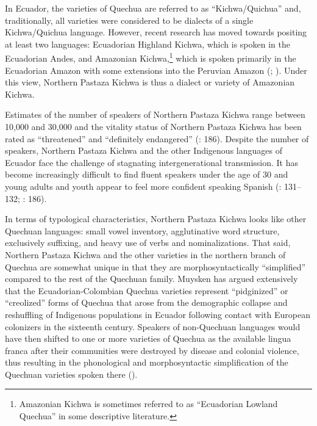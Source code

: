\documentclass[output=paper]{langscibook}
\begin{document}
In Ecuador, the varieties of Quechua are referred to as “Kichwa/Quichua” and, traditionally, all varieties were considered to be dialects of a single Kichwa/Quichua language. However, recent research has moved towards positing at least two languages: Ecuadorian Highland Kichwa, which is spoken in the Ecuadorian Andes, and Amazonian Kichwa,\footnote{Amazonian Kichwa is sometimes referred to as “Ecuadorian Lowland Quechua” in some descriptive literature.} which is spoken primarily in the Ecuadorian Amazon with some extensions into the Peruvian Amazon (\citealt{Grzech2019}; \citealt{Muysken2019a}). Under this view, Northern Pastaza Kichwa is thus a dialect or variety of Amazonian Kichwa.

Estimates of the number of speakers of Northern Pastaza Kichwa range between 10,000 and 30,000 and the vitality status of Northern Pastaza Kichwa has been rated as “threatened” and “definitely endangered” (\citealt{Nathan2014}: 186). Despite the number of speakers, Northern Pastaza Kichwa and the other Indigenous languages of Ecuador face the challenge of stagnating intergenerational transmission. It has become increasingly difficult to find fluent speakers under the age of 30 and young adults and youth appear to feel more confident speaking Spanish (\citealt{Grzech2019}: 131–132; \citealt{Nathan2014}: 186). 

In terms of typological characteristics, Northern Pastaza Kichwa looks like other Quechuan languages: small vowel inventory, agglutinative word structure, exclusively suffixing, and heavy use of verbs and nominalizations. That said, Northern Pastaza Kichwa and the other varieties in the northern branch of Quechua are somewhat unique in that they are morphosyntactically “simplified” compared to the rest of the Quechuan family. Muysken has argued extensively that the Ecuadorian-Colombian Quechua varieties represent “pidginized” or “creolized” forms of Quechua that arose from the demographic collapse and reshuffling of Indigenous populations in Ecuador following contact with European colonizers in the sixteenth century. Speakers of non-Quechuan languages would have then shifted to one or more varieties of Quechua as the available lingua franca after their communities were destroyed by disease and colonial violence, thus resulting in the phonological and morphosyntactic simplification of the Quechuan varieties spoken there (\citealt{Muysken2000,Muysken2009,Muysken2019a,Muysken2021}).
\end{document}
